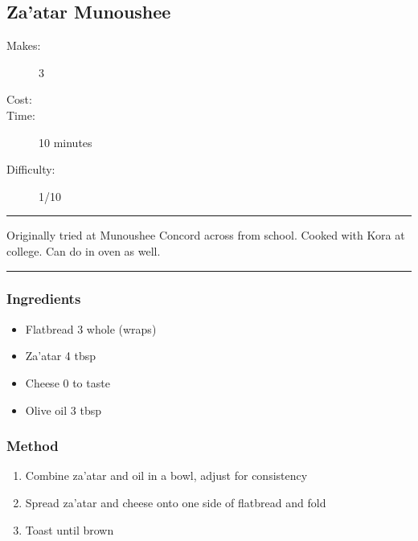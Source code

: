 \documentclass[]{article}
\begin{document}
\subsection*{\center\huge Za'atar Munoushee}
\begin{description}
\item[Makes:] 3 
\item[Cost:] \textdollar
\item[Time:] 10 minutes
\item[Difficulty:] 1/10
\end{description}
\vspace{0.2cm}\hrule\vspace{0.5cm}
\begin{adjustwidth}{0.5 cm}{0.5 cm}

Originally tried at Munoushee Concord across from school. Cooked with Kora at college. Can do in oven as well. \hfill{}\color{black}

\end{adjustwidth}
\vspace{0.5cm}\hrule
\subsubsection*{\Large Ingredients}
\begin{multicols}{2}
\begin{itemize}
 \item Flatbread \hfill 3 whole (wraps)
 \item Za'atar \hfill 4 tbsp
 \item Cheese \hfill 0 to taste
 \item Olive oil \hfill 3 tbsp
\end{itemize}
\end{multicols}
\subsubsection*{\Large Method}
\begin{enumerate}[font=\huge\color{accent}]
	\item Combine za'atar and oil in a bowl, adjust for consistency
	\item Spread za'atar and cheese onto one side of flatbread and fold
	\item Toast until brown
\end{enumerate}
\newpage
{}
\end{document}
